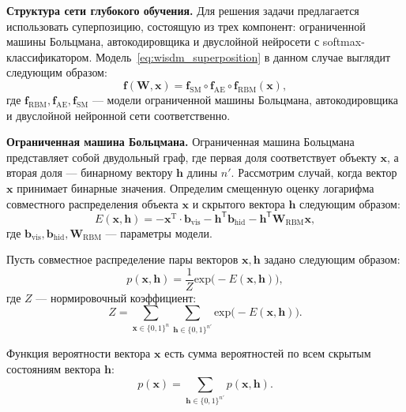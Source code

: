 \textbf{Структура сети глубокого обучения. }
Для решения задачи предлагается использовать суперпозицию, состоящую из трех компонент:
ограниченной машины Больцмана, автокодировщика и двуслойной нейросети с softmax-классификатором.
Модель~\eqref{eq:wisdm_superposition} в данном случае выглядит следующим образом:
\[
    \mathbf{f}(\mathbf{W}, \mathbf{x}) = \mathbf{f}_\text{SM} \circ \mathbf{f}_\text{AE} \circ  \mathbf{f}_\text{RBM}(\mathbf{x}),
\]
где $\mathbf{f}_\text{RBM}, \mathbf{f}_\text{AE}, \mathbf{f}_\text{SM}$ --- модели ограниченной машины Больцмана, автокодировщика и двуслойной нейронной сети соответственно.

\textbf{Ограниченная машина Больцмана.}
Ограниченная машина Больцмана представляет собой двудольный граф, где первая доля соответствует объекту $\mathbf{x}$, а вторая доля --- бинарному вектору $\mathbf{h}$ длины $n'$.
Рассмотрим случай, когда вектор $\mathbf{x}$ принимает бинарные значения. Определим смещенную оценку логарифма совместного распределения объекта $\mathbf{x}$ и скрытого вектора $\mathbf{h}$ следующим образом:
\begin{equation}
 E(\mathbf{x},\mathbf{h}) = -\mathbf{x}^\text{T} \cdot \mathbf{b}_\text{vis} -\mathbf{h}^\mathsf{T}  \mathbf{b}_\text{hid} - \mathbf{h}^\mathsf{T}\mathbf{W}_\text{RBM}\mathbf{x},
\label{eq:energy}
\end{equation}
где $\mathbf{b}_\text{vis}, \mathbf{b}_\text{hid}, \mathbf{W}_\text{RBM}$ --- параметры модели.

Пусть совместное распределение пары векторов $\mathbf{x}, \mathbf{h}$ задано следующим образом:
\[
	p(\mathbf{x}, \mathbf{h}) = \frac{1}{Z} \text{exp}\bigl(-E(\mathbf{x},\mathbf{h})\bigr),
\]
где $Z$ --- нормировочный коэффициент:
\[
 Z = \sum_{\mathbf{x} \in \{0,1\}^n} \sum_{\mathbf{h}\in \{0,1\}^{n'}} \text{exp}\bigl(-E(\mathbf{x},\mathbf{h})\bigr).
\]


Функция вероятности вектора $\mathbf{x}$ есть сумма вероятностей по всем скрытым состояниям вектора $\mathbf{h}$:
\[
	p(\mathbf{x}) = \sum_{\mathbf{h}\in \{0,1\}^{n'}} p(\mathbf{x}, \mathbf{h}).
\]

